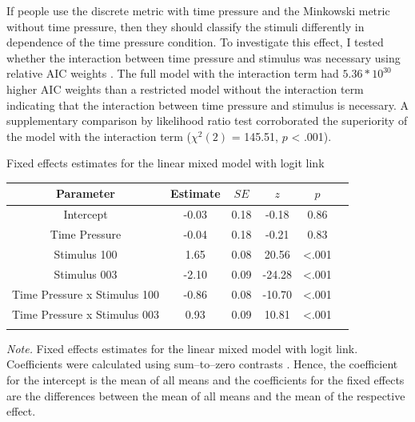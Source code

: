 \documentclass[a4paper,man,natbib]{apa6}
\begin{document}
If people use the discrete metric with time pressure and the Minkowski metric without time pressure, then they should classify the stimuli differently in dependence of the time pressure condition. To investigate this effect, I tested whether the interaction between time pressure and stimulus was necessary using relative AIC weights \citep[][p. 194]{wagenmakers2004aic}. The full model with the interaction term had $5.36 * 10^{30}$ higher AIC weights than a restricted model without the interaction term indicating that the interaction between time pressure and stimulus is necessary. A supplementary comparison by likelihood ratio test corroborated the superiority of the model with the interaction term ($\chi^{2}(2)$ = 145.51, $p$ < .001). 

\begin{center}
\begin{threeparttable}
\caption{Fixed effects estimates for the linear mixed model with logit link}
\label{tab:estimates}
\begin{tabular*}{\textwidth}{c @{\extracolsep{\fill}} ccccc}
\toprule
\multicolumn{1}{c}{Parameter} & \multicolumn{1}{c}{Estimate} & \multicolumn{1}{c}{$SE$} & \multicolumn{1}{c}{$z$} & \multicolumn{1}{c}{$p$}\\
\midrule
\addlinespace
Intercept & -0.03 & 0.18 & -0.18 & 0.86\\
Time Pressure & -0.04 & 0.18 & -0.21 & 0.83\\
Stimulus 100 & 1.65 & 0.08 & 20.56 & <.001\\
Stimulus 003 & -2.10 & 0.09 & -24.28 & <.001\\
Time Pressure x Stimulus 100 & -0.86 & 0.08 & -10.70 & <.001\\
Time Pressure x Stimulus 003 & 0.93 & 0.09 & 10.81 & <.001\\
\bottomrule
\addlinespace
\end{tabular*}
\begin{tablenotes}[para]
\textit{Note.} Fixed effects estimates for the linear mixed model with logit link. Coefficients were calculated using sum--to--zero contrasts \citep{singmann2017introduction}. Hence, the coefficient for the intercept is the mean of all means and the coefficients for the fixed effects are the differences between the mean of all means and the mean of the respective effect.
\end{tablenotes}
\end{threeparttable}
\end{center}
\vspace{\baselineskip}
\end{document}
